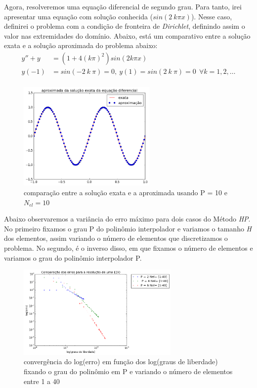  Agora, resolveremos uma equação diferencial de segundo grau. Para tanto, irei apresentar uma equação com solução conhecida ($sin(2\ k \pi x)$). Nesse caso, definirei o problema com a condição de fronteira de \emph{Dirichlet}, definindo assim o valor nas extremidades do domínio. Abaixo, está um comparativo entre a solução exata e a solução aproximada do problema abaixo:
\begin{align}
y'' + y &= (1 + 4 (k \pi)^2)sin(2 k \pi x) \\
y(-1) &= sin(-2\ k \ \pi ) = 0 ,\ y(1) = sin(2\ k\ \pi) = 0 \ \ \forall k = 1,2,\dots \\
\end{align}	
\begin{figure}[H]
\centering
\includegraphics[width=0.6\textwidth,center]{figuras/solu_edo_simul.png}
\caption{comparação entre a solução exata e a aproximada usando P = 10 e $N_{el} = 10$ } 
\end{figure}
 Abaixo observaremos a variância do erro máximo para dois casos do Método \emph{HP}. No primeiro fixamos o grau P do polinômio interpolador e variamos o tamanho \emph{H} dos elementos, assim variando o número de elementos que discretizamos o problema. No segundo, é o inverso disso, em que fixamos o número de elementos e variamos o grau do polinômio interpolador P.

\begin{figure}[!ht]
  \includegraphics[width=0.7\textwidth,center]{figuras/convergencia_erro_EDO_h.png}
  \caption{convergência do log(erro) em função dos log(graus de liberdade) fixando o grau do polinômio em P e variando o número de elementos entre 1 a 40 }
\end{figure}


